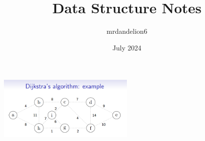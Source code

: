 \documentclass{article}
\title{Data Structure Notes}
\author{mrdandelion6}
\date{July 2024}
\begin{document}
\begin{center}
\includegraphics[width=0.5\textwidth]{../figures/dijkstra.png}
\end{center}
\end{document}
